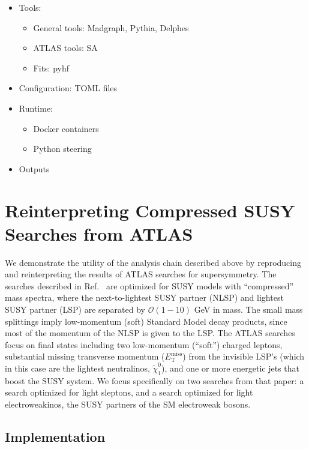 \documentclass{article}
\newcommand{\chioz}{\ensuremath{\widetilde{\chi}_{1}^{0}}}
\newcommand{\met}{\ensuremath{E_{\mathrm{T}}^{\mathrm{miss}}}}
\begin{document}
\begin{itemize}
\item Tools:
  \begin{itemize}
  \item General tools: Madgraph, Pythia, Delphes
  \item ATLAS tools: SA
  \item Fits: pyhf
  \end{itemize}
\item Configuration: TOML files
\item Runtime:
  \begin{itemize}
  \item Docker containers
  \item Python steering
  \end{itemize}
\item Outputs
\end{itemize}

\section{Reinterpreting Compressed SUSY Searches from ATLAS}
\label{sec:reinterp}

We demonstrate the utility of the analysis chain described above by reproducing and reinterpreting the results of ATLAS searches for supersymmetry.  The searches described in Ref.~\cite{ATLAS:2019lng} are optimized for SUSY models with ``compressed'' mass spectra, where the next-to-lightest SUSY partner (NLSP) and lightest SUSY partner (LSP) are separated by $\mathcal{O}(1-10)$ GeV in mass.  The small mass splittings imply low-momentum (soft) Standard Model decay products, since most of the momentum of the NLSP is given to the LSP.  The ATLAS searches focus on final states including two low-momentum (``soft'') charged leptons, substantial missing transverse momentum (\met) from the invisible LSP's (which in this case are the lightest neutralinos, \chioz), and one or more energetic jets that boost the SUSY system.  We focus specifically on two searches from that paper: a search optimized for light sleptons, and a search optimized for light electroweakinos, the SUSY partners of the SM electroweak bosons.

\subsection{Implementation}
\label{sec:reinterp-imp}
\end{document}
